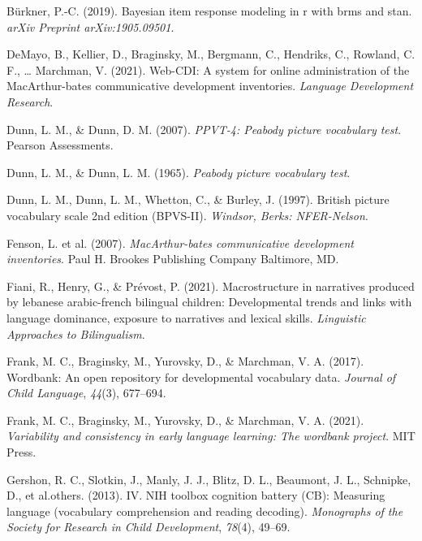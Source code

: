 \documentclass[
  man,floatsintext]{apa6}
\newlength{\cslhangindent}
\newlength{\cslentryspacingunit} %
\newenvironment{CSLReferences}[2] %
 {%
  \setlength{\parindent}{0pt}
  \ifodd #1
  \let\oldpar\par
  \def\par{\hangindent=\cslhangindent\oldpar}
  \fi
  \setlength{\parskip}{#2\cslentryspacingunit}
 }%
 {}
\begin{document}
\begin{CSLReferences}{1}{0}
\leavevmode{}%
Bürkner, P.-C. (2019). Bayesian item response modeling in r with brms and stan. \emph{arXiv Preprint arXiv:1905.09501}.

\leavevmode{}%
DeMayo, B., Kellier, D., Braginsky, M., Bergmann, C., Hendriks, C., Rowland, C. F., \ldots{} Marchman, V. (2021). Web-CDI: A system for online administration of the MacArthur-bates communicative development inventories. \emph{Language Development Research}.

\leavevmode{}%
Dunn, L. M., \& Dunn, D. M. (2007). \emph{PPVT-4: Peabody picture vocabulary test}. Pearson Assessments.

\leavevmode{}%
Dunn, L. M., \& Dunn, L. M. (1965). \emph{Peabody picture vocabulary test}.

\leavevmode{}%
Dunn, L. M., Dunn, L. M., Whetton, C., \& Burley, J. (1997). British picture vocabulary scale 2nd edition (BPVS-II). \emph{Windsor, Berks: NFER-Nelson}.

\leavevmode{}%
Fenson, L. et al. (2007). \emph{MacArthur-bates communicative development inventories}. Paul H. Brookes Publishing Company Baltimore, MD.

\leavevmode{}%
Fiani, R., Henry, G., \& Prévost, P. (2021). Macrostructure in narratives produced by lebanese arabic-french bilingual children: Developmental trends and links with language dominance, exposure to narratives and lexical skills. \emph{Linguistic Approaches to Bilingualism}.

\leavevmode{}%
Frank, M. C., Braginsky, M., Yurovsky, D., \& Marchman, V. A. (2017). Wordbank: An open repository for developmental vocabulary data. \emph{Journal of Child Language}, \emph{44}(3), 677--694.

\leavevmode{}%
Frank, M. C., Braginsky, M., Yurovsky, D., \& Marchman, V. A. (2021). \emph{Variability and consistency in early language learning: The wordbank project}. MIT Press.

\leavevmode{}%
Gershon, R. C., Slotkin, J., Manly, J. J., Blitz, D. L., Beaumont, J. L., Schnipke, D., et al.others. (2013). IV. NIH toolbox cognition battery (CB): Measuring language (vocabulary comprehension and reading decoding). \emph{Monographs of the Society for Research in Child Development}, \emph{78}(4), 49--69.


\end{CSLReferences}
\end{document}
